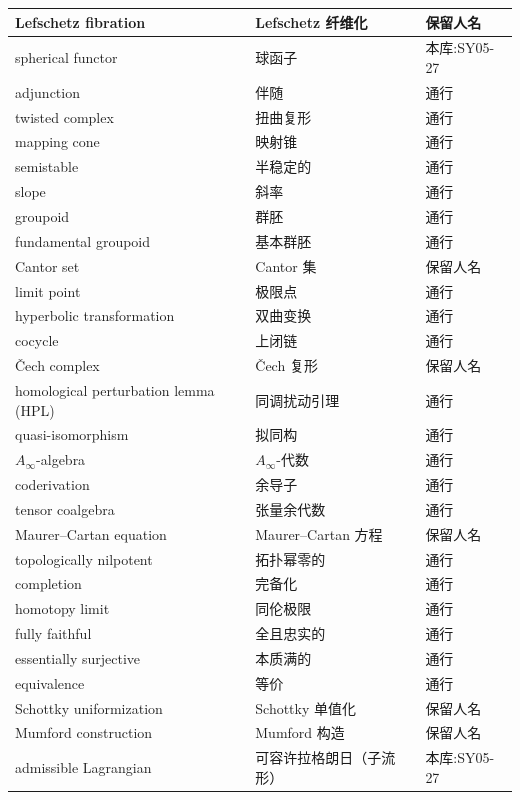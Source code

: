 \begin{longtable}{@{}p{}p{}p{}@{}}
\midrule
Lefschetz fibration & Lefschetz 纤维化 & 保留人名 \\
\midrule
spherical functor & 球函子 & 本库:SY05-27 \\
\midrule
adjunction & 伴随 & 通行 \\
\midrule
twisted complex & 扭曲复形 & 通行 \\
\midrule
mapping cone & 映射锥 & 通行 \\
\midrule
semistable & 半稳定的 & 通行 \\
\midrule
slope & 斜率 & 通行 \\
\midrule
groupoid & 群胚 & 通行 \\
\midrule
fundamental groupoid & 基本群胚 & 通行 \\
\midrule
Cantor set & Cantor 集 & 保留人名 \\
\midrule
limit point & 极限点 & 通行 \\
\midrule
hyperbolic transformation & 双曲变换 & 通行 \\
\midrule
cocycle & 上闭链 & 通行 \\
\midrule
Čech complex & Čech 复形 & 保留人名 \\
\midrule
homological perturbation lemma (HPL) & 同调扰动引理 & 通行 \\
\midrule
quasi-isomorphism & 拟同构 & 通行 \\
\midrule
$A_\infty$-algebra & $A_\infty$-代数 & 通行 \\
\midrule
coderivation & 余导子 & 通行 \\
\midrule
tensor coalgebra & 张量余代数 & 通行 \\
\midrule
Maurer–Cartan equation & Maurer–Cartan 方程 & 保留人名 \\
\midrule
topologically nilpotent & 拓扑幂零的 & 通行 \\
\midrule
completion & 完备化 & 通行 \\
\midrule
homotopy limit & 同伦极限 & 通行 \\
\midrule
fully faithful & 全且忠实的 & 通行 \\
\midrule
essentially surjective & 本质满的 & 通行 \\
\midrule
equivalence & 等价 & 通行 \\
\midrule
Schottky uniformization & Schottky 单值化 & 保留人名 \\
\midrule
Mumford construction & Mumford 构造 & 保留人名 \\
\midrule
admissible Lagrangian & 可容许拉格朗日（子流形） & 本库:SY05-27 \\
\midrule

\end{longtable}
